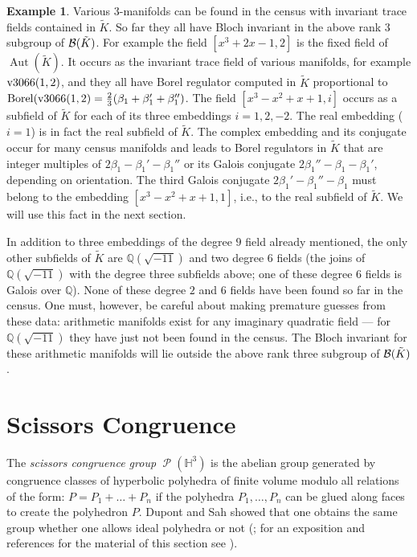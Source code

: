 \documentclass[a4paper]{amsart}
\def\H{{\mathbb H}}
\def\Q{{\mathbb Q}}
\def\K{\tilde{K}}
\theoremstyle{definition}
\newtheorem{example}[theorem]{Example}
\begin{document}
\begin{example}
Various 3-manifolds can be found in the census with invariant trace
fields contained in $\K$. So far they all have Bloch invariant in the
above rank 3 subgroup of $\Bloch(\K)$. For example the field
$[x^3+2x-1,2]$ is the fixed field of $\operatorname{Aut}(\K)$. It
occurs as the invariant trace field of various manifolds, for example
$\hbox{v3066}(1,2)$, and they all have Borel regulator computed in
$\K$ proportional to
$\operatorname{Borel}(\hbox{v3066}(1,2)=\frac23(\beta_1+\beta_1'+\beta_1'')$. The
field $[x^3 - x^2 + x + 1,i]$ occurs as a subfield of $\K$ for each of
its three embeddings $i=1,2,-2$. The real embedding ($i=1$) is in fact
the real subfield of $\K$. The complex embedding and its conjugate
occur for many census manifolds and leads to Borel regulators in $\K$
that are integer multiples of $2\beta_1-\beta_1'-\beta_1''$ or its
Galois conjugate $2\beta_1''-\beta_1-\beta_1'$, depending on
orientation. The third Galois conjugate $2\beta_1'-\beta_1''-\beta_1$
must belong to the embedding $[x^3-x^2+x+1,1]$, i.e., to the real
subfield of $\K$. We will use this fact in the next section. 

In addition to three embeddings of the degree $9$ field already
mentioned, the only other subfields of $\K$ are $\Q(\sqrt{-11})$ and
two degree $6$ fields (the joins of $\Q(\sqrt{-11})$ with the degree
three subfields above; one of these degree $6$ fields is Galois over
$\Q$). None of these degree $2$ and $6$ fields have been found so far
in the census. One must, however, be careful about making premature
guesses from these data: arithmetic manifolds exist for any imaginary
quadratic field --- for $\Q(\sqrt{-11})$ they have just not been found
in the census. The Bloch invariant for these arithmetic manifolds will
lie outside the above rank three subgroup of $\Bloch(\K)$.
\end{example}

\section{Scissors Congruence}

\def\sc{\operatorname{\mathcal P}}
\def\dehnker{\operatorname{\mathcal D}}

The \emph{scissors congruence group} $\sc(\H^3)$ is the abelian group
generated by congruence classes of hyperbolic polyhedra of finite
volume modulo all relations of the form: $P=P_1+\dots+P_n$ if the
polyhedra $P_1,\dots,P_n$ can be glued along faces to create the
polyhedron $P$. Dupont and Sah showed that one obtains the same group
whether one allows ideal polyhedra or not (\cite{dupont-sah}; for an
exposition and references for the material of this section see
\cite{neumann-hilbert}).
\end{document}
